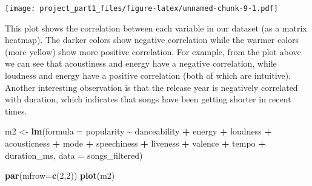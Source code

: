 \documentclass[
]{article}
\newenvironment{Shaded}{\begin{snugshade}}{\end{snugshade}}
\newcommand{\AttributeTok}[1]{\textcolor[rgb]{0.13,0.29,0.53}{#1}}
\newcommand{\DecValTok}[1]{\textcolor[rgb]{0.00,0.00,0.81}{#1}}
\newcommand{\FunctionTok}[1]{\textcolor[rgb]{0.13,0.29,0.53}{\textbf{#1}}}
\newcommand{\NormalTok}[1]{#1}
\newcommand{\OtherTok}[1]{\textcolor[rgb]{0.56,0.35,0.01}{#1}}
\newcommand{\SpecialCharTok}[1]{\textcolor[rgb]{0.81,0.36,0.00}{\textbf{#1}}}
\begin{document}
\texttt{[image: project\_part1\_files/figure-latex/unnamed-chunk-9-1.pdf]}

This plot shows the correlation between each variable in our dataset (as
a matrix heatmap). The darker colors show negative correlation while the
warmer colors (more yellow) show more positive correlation. For example,
from the plot above we can see that acoustiness and energy have a
negative correlation, while loudness and energy have a positive
correlation (both of which are intuitive). Another interesting
observation is that the release year is negatively correlated with
duration, which indicates that songs have been getting shorter in recent
times.

\begin{Shaded}
\begin{Highlighting}[]
\NormalTok{m2 }\OtherTok{\textless{}{-}} \FunctionTok{lm}\NormalTok{(}\AttributeTok{formula =}\NormalTok{ popularity }\SpecialCharTok{\textasciitilde{}}\NormalTok{ danceability }\SpecialCharTok{+} 
\NormalTok{          energy }\SpecialCharTok{+}\NormalTok{ loudness }\SpecialCharTok{+}\NormalTok{ acousticness }\SpecialCharTok{+}\NormalTok{ mode }\SpecialCharTok{+}  
\NormalTok{          speechiness }\SpecialCharTok{+}\NormalTok{ liveness  }\SpecialCharTok{+}\NormalTok{ valence }\SpecialCharTok{+}\NormalTok{ tempo }\SpecialCharTok{+}
\NormalTok{          duration\_ms, }\AttributeTok{data =}\NormalTok{ songs\_filtered)}

\FunctionTok{par}\NormalTok{(}\AttributeTok{mfrow=}\FunctionTok{c}\NormalTok{(}\DecValTok{2}\NormalTok{,}\DecValTok{2}\NormalTok{)) }
\FunctionTok{plot}\NormalTok{(m2)}
\end{Highlighting}
\end{Shaded}
\end{document}
